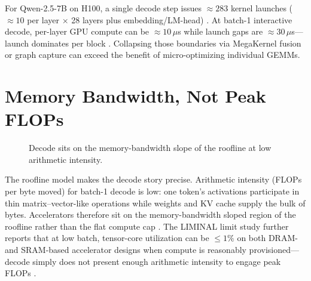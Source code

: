 \begin{example}
For Qwen-2.5-7B on H100, a single decode step issues ${\approx}283$ kernel launches (${\approx}10$ per layer $\times$ 28 layers plus embedding/LM-head) \citep{memoryfloor2026}.
At batch-1 interactive decode, per-layer GPU compute can be ${\approx}10$\,$\mu$s while launch gaps are ${\approx}30$\,$\mu$s---launch dominates per block \citep{memoryfloor2026}.
Collapsing those boundaries via MegaKernel fusion or graph capture can exceed the benefit of micro-optimizing individual GEMMs.
\end{example}

\section{Memory Bandwidth, Not Peak FLOPs}
\label{sec:memory_not_compute}
\begin{figure}[t]
\centering
{}
\caption{Decode sits on the memory-bandwidth slope of the roofline at low arithmetic intensity.}
\label{fig:roofline_decode}
\end{figure}


The roofline model makes the decode story precise.
Arithmetic intensity (FLOPs per byte moved) for batch-1 decode is low: one token's activations participate in thin matrix--vector-like operations while weights and KV cache supply the bulk of bytes.
Accelerators therefore sit on the memory-bandwidth sloped region of the roofline rather than the flat compute cap \citep{patel2025llminference,memoryfloor2026}.
The LIMINAL limit study further reports that at low batch, tensor-core utilization can be $\leq 1\%$ on both DRAM- and SRAM-based accelerator designs when compute is reasonably provisioned---decode simply does not present enough arithmetic intensity to engage peak FLOPs \citep{patel2025llminference}.

